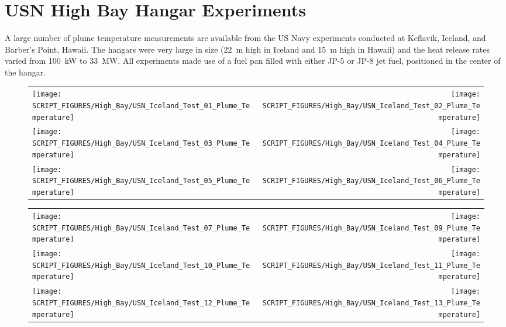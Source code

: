 \clearpage

\section{USN High Bay Hangar Experiments}

\label{USN_Plume}

A large number of plume temperature measurements are available from the US Navy experiments conducted at Keflavik, Iceland, and Barber's Point, Hawaii. The hangars were very large in size (22~m high in Iceland and 15~m high in Hawaii) and the heat release rates varied from 100~kW to 33~MW. All experiments made use of a fuel pan filled with either JP-5 or JP-8 jet fuel, positioned in the center of the hangar.


\begin{figure}[h!]
\begin{tabular*}{\textwidth}{l@{\extracolsep{\fill}}r}
\texttt{[image: SCRIPT\_FIGURES/High\_Bay/USN\_Iceland\_Test\_01\_Plume\_Temperature]} &
\texttt{[image: SCRIPT\_FIGURES/High\_Bay/USN\_Iceland\_Test\_02\_Plume\_Temperature]} \\
\texttt{[image: SCRIPT\_FIGURES/High\_Bay/USN\_Iceland\_Test\_03\_Plume\_Temperature]} &
\texttt{[image: SCRIPT\_FIGURES/High\_Bay/USN\_Iceland\_Test\_04\_Plume\_Temperature]} \\
\texttt{[image: SCRIPT\_FIGURES/High\_Bay/USN\_Iceland\_Test\_05\_Plume\_Temperature]} &
\texttt{[image: SCRIPT\_FIGURES/High\_Bay/USN\_Iceland\_Test\_06\_Plume\_Temperature]} \\
\end{tabular*}
\label{USN_Plume_Iceland_Plume_Temperature}
\end{figure}

\begin{figure}[p]
\begin{tabular*}{\textwidth}{l@{\extracolsep{\fill}}r}
\texttt{[image: SCRIPT\_FIGURES/High\_Bay/USN\_Iceland\_Test\_07\_Plume\_Temperature]} &
\texttt{[image: SCRIPT\_FIGURES/High\_Bay/USN\_Iceland\_Test\_09\_Plume\_Temperature]} \\
\texttt{[image: SCRIPT\_FIGURES/High\_Bay/USN\_Iceland\_Test\_10\_Plume\_Temperature]} &
\texttt{[image: SCRIPT\_FIGURES/High\_Bay/USN\_Iceland\_Test\_11\_Plume\_Temperature]} \\
\texttt{[image: SCRIPT\_FIGURES/High\_Bay/USN\_Iceland\_Test\_12\_Plume\_Temperature]} &
\texttt{[image: SCRIPT\_FIGURES/High\_Bay/USN\_Iceland\_Test\_13\_Plume\_Temperature]} \\
\end{tabular*}
\label{USN_Plume_Iceland_2}
\end{figure}

